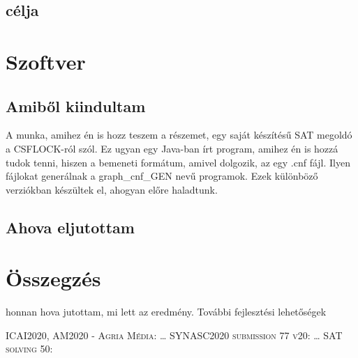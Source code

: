 \documentclass[
]{thesis-ekf}
\newtheorem{tetel}{Tétel}[chapter]
\theoremstyle{definition}
\theoremstyle{remark}
\begin{document}
	\section{célja}
	
	\chapter{Szoftver}
	\section{Amiből kiindultam}
	A munka, amihez én is hozz teszem a részemet, egy saját készítésű SAT megoldó a CSFLOCK-ról szól. Ez ugyan egy Java-ban írt program, amihez én is hozzá tudok tenni, hiszen a bemeneti formátum, amivel dolgozik, az egy .cnf fájl. Ilyen fájlokat generálnak a graph\_cnf\_GEN nevű programok. Ezek különböző verziókban készültek el, ahogyan előre haladtunk.
	
	\section{Ahova eljutottam}
	
%	

	
	\chapter*{Összegzés}
	honnan hova jutottam, mi lett az eredmény. További fejlesztési lehetőségek
	

	
	\begin{thebibliography}{2}
		\textsc{ICAI2020, AM2020 - Agria Média}: \dots
		\textsc{SYNASC2020 submission 77 v20}: \dots
		\textsc{SAT solving 50}:
	\end{thebibliography}
	
	
\end{document}
